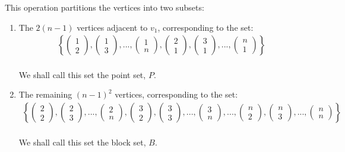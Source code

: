 \documentclass{article}
\begin{document}
This operation partitions the vertices into two subsets:
\begin{enumerate}
    \item The \( 2(n-1) \) vertices adjacent to \( v_1 \), corresponding to the set:
    \begin{align*}
        \left\{ \begin{pmatrix} 1 \\ 2 \end{pmatrix}, \begin{pmatrix} 1 \\ 3 \end{pmatrix},..., \begin{pmatrix} 1 \\ n \end{pmatrix}, \begin{pmatrix} 2 \\ 1 \end{pmatrix}, \begin{pmatrix} 3 \\ 1 \end{pmatrix},..., \begin{pmatrix} n \\ 1 \end{pmatrix} \right\}
    \end{align*} \\
    We shall call this set the point set, $P$.
    \item The remaining \( (n-1)^2 \) vertices, corresponding to the set:
    \begin{align*}
        \left\{ \begin{pmatrix} 2 \\ 2 \end{pmatrix}, \begin{pmatrix} 2 \\ 3 \end{pmatrix},...,\begin{pmatrix} 2 \\ n \end{pmatrix},\begin{pmatrix} 3 \\ 2 \end{pmatrix}, \begin{pmatrix} 3 \\ 3 \end{pmatrix},...,\begin{pmatrix} 3 \\ n \end{pmatrix},...,\begin{pmatrix} n \\ 2 \end{pmatrix}, \begin{pmatrix} n \\ 3 \end{pmatrix},...,\begin{pmatrix} n \\ n \end{pmatrix} \right \}
    \end{align*} \\
    We shall call this set the block set, $B$.
\end{enumerate}
\end{document}
